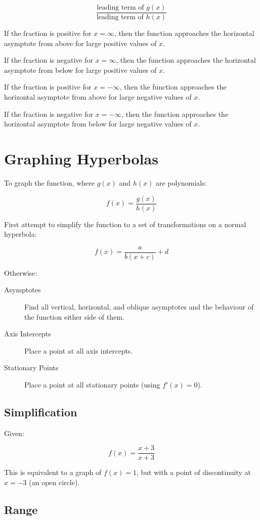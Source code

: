 \documentclass[a4paper,11pt]{report}
\begin{document}
$$
\frac{\text{leading term of $g(x)$}}{\text{leading term of $h(x)$}}
$$

If the fraction is positive for $x = \infty$, then the function approaches the
horizontal asymptote from above for large positive values of $x$.

If the fraction is negative for $x = \infty$, then the function approaches the
horizontal asymptote from below for large positive values of $x$.

If the fraction is positive for $x = -\infty$, then the function approaches the
horizontal asymptote from above for large negative values of $x$.

If the fraction is negative for $x = -\infty$, then the function approaches the
horizontal asymptote from below for large negative values of $x$.


\section{Graphing Hyperbolas}

To graph the function, where $g(x)$ and $h(x)$ are polynomials:

$$
f(x) = \frac{g(x)}{h(x)}
$$

First attempt to simplify the function to a set of transformations on a normal
hyperbola:

$$
f(x) = \frac{a}{b(x + c)} + d
$$

Otherwise:

\begin{description}
\item [Asymptotes] Find all vertical, horizontal, and oblique asymptotes and
	the behaviour of the function either side of them.
\item [Axis Intercepts] Place a point at all axis intercepts.
\item [Stationary Points] Place a point at all stationary points (using
	$f'(x) = 0$).
\end{description}

\subsection{Simplification}

Given:

$$
f(x) = \frac{x + 3}{x + 3}
$$

This is equivalent to a graph of $f(x) = 1$, but with a point of discontinuity
at $x = -3$ (an open circle).

\subsection{Range}
\end{document}
